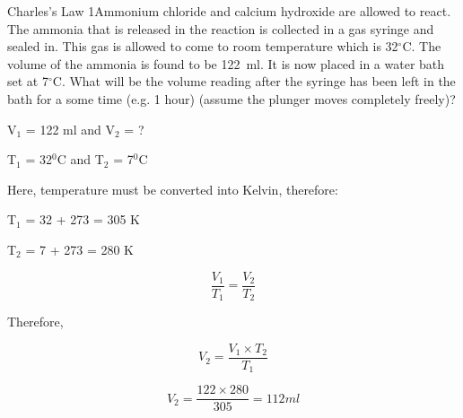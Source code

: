\begin{wex}{Charles's Law 1}{Ammonium chloride and calcium hydroxide are allowed to react. The ammonia that is released in the reaction is collected in a gas syringe and sealed in. This gas is allowed to come to room temperature which is 32$^\circ$C. The volume of the ammonia is found to be 122~ml. It is now placed in a water bath set at 7$^\circ$C. What will be the volume reading after the syringe has been left in the bath for a some time (e.g. 1 hour) (assume the plunger moves completely freely)?\\}

{
V$_{1}$ = 122 ml and V$_{2}$ = ?



T$_{1}$ = 32$^{0}$C and T$_{2}$ = 7$^{0}$C\\
}

{
Here, temperature must be converted into Kelvin, therefore:

T$_{1}$ = 32 + 273 = 305 K

T$_{2}$ = 7 + 273 = 280 K\\
}

{

\begin{equation*}
\frac{V_{1}}{T_{1}} = \frac{V_{2}}{T_{2}}
\end{equation*}

Therefore,

\begin{equation*}
V_{2} = \frac{V_{1} \times T_{2}}{T_{1}}
\end{equation*}
}

{

\begin{equation*}
V_{2} = \frac{122 \times 280}{305} = 112 ml
\end{equation*}
}

\end{wex}


